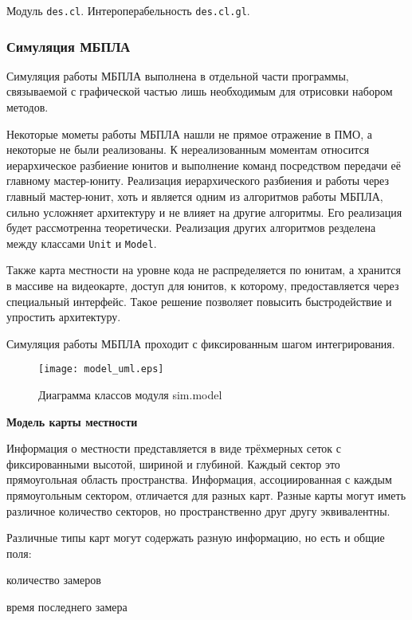 Модуль \verb|des.cl|. Интероперабельность \verb|des.cl.gl|.

\newpage
\subsubsection{Симуляция МБПЛА}

Симуляция работы МБПЛА выполнена в отдельной части программы,
связываемой с графической частью лишь необходимым для отрисовки
набором методов.

Некоторые мометы работы МБПЛА нашли не прямое отражение в ПМО,
а некоторые не были реализованы. К нереализованным моментам относится
иерархическое разбиение юнитов и выполнение команд посредством передачи
её главному мастер-юниту. Реализация иерархического разбиения и
работы через главный мастер-юнит, хоть и является одним из алгоритмов
работы МБПЛА, сильно усложняет архитектуру и не влияет на другие
алгоритмы. Его реализация будет рассмотренна теоретически.
Реализация других алгоритмов резделена между классами \verb|Unit|
и \verb|Model|.

Также карта местности на уровне кода не распределяется по юнитам,
а хранится в массиве на видеокарте, доступ для юнитов, к которому,
предоставляется через специальный интерфейс. Такое решение позволяет
повысить быстродействие и упростить архитектуру.

Симуляция работы МБПЛА проходит с фиксированным шагом интегрирования.

\begin{figure}[h!]
    \centering
    \texttt{[image: model\_uml.eps]}
    \caption{Диаграмма классов модуля sim.model}
    \label{fig:model_uml}
\end{figure}

\clearpage
\newpage

\textbf{Модель карты местности}

Информация о местности представляется в виде трёхмерных сеток с фиксированными
высотой, шириной и глубиной. Каждый сектор это прямоугольная область пространства.
Информация, ассоциированная с каждым прямоугольным сектором, отличается для разных
карт. Разные карты могут иметь различное количество секторов, но пространственно
друг другу эквивалентны.

Различные типы карт могут содержать разную информацию, но есть и общие поля:

\begin{mintemize}
\item количество замеров
\item время последнего замера
\end{mintemize}

